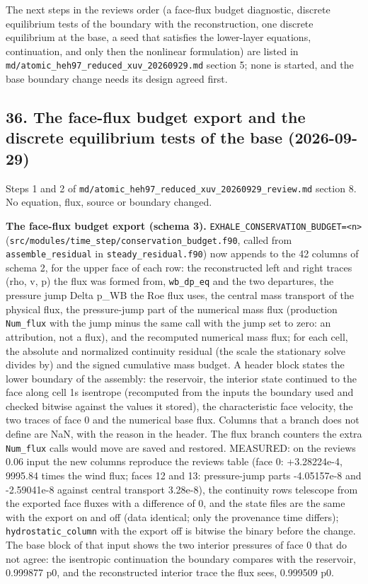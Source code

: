 \documentclass[english,a4paper]{my_memo}
\begin{document}
The next steps in the review\textquotesingle s order (a face-flux budget diagnostic,
discrete equilibrium tests of the boundary with the reconstruction, one
discrete equilibrium at the base, a seed that satisfies the lower-layer
equations, continuation, and only then the nonlinear formulation) are listed
in \texttt{md/atomic\_heh97\_reduced\_xuv\_20260929.md} section 5; none is started, and
the base boundary change needs its design agreed first.

\subsection{36. The face-flux budget export and the discrete equilibrium tests of the base (2026-09-29)}\label{36-the-face-flux-budget-export-and-the-discrete-equilibrium-tests-of-the-base-2026-09-29}

Steps 1 and 2 of \texttt{md/atomic\_heh97\_reduced\_xuv\_20260929\_review.md} section 8.
No equation, flux, source or boundary changed.

\textbf{The face-flux budget export (schema 3).} \texttt{EXHALE\_CONSERVATION\_BUDGET=\textless{}n\textgreater{}}
(\texttt{src/modules/time\_step/conservation\_budget.f90}, called from
\texttt{assemble\_residual} in \texttt{steady\_residual.f90}) now appends to the 42 columns
of schema 2, for the upper face of each row: the reconstructed left and right
traces (rho, v, p) the flux was formed from, \texttt{wb\_dp\_eq} and the two
departures, the pressure jump Delta p\_WB the Roe flux uses, the central mass
transport of the physical flux, the pressure-jump part of the numerical mass
flux (production \texttt{Num\_flux} with the jump minus the same call with the jump
set to zero: an attribution, not a flux), and the recomputed numerical mass
flux; for each cell, the absolute and normalized continuity residual (the
scale the stationary solve divides by) and the signed cumulative mass budget.
A header block states the lower boundary of the assembly: the reservoir, the
interior state continued to the face along cell 1\textquotesingle s isentrope (recomputed
from the inputs the boundary used and checked bitwise against the values it
stored), the characteristic face velocity, the two traces of face 0 and the
numerical base flux. Columns that a branch does not define are NaN, with the
reason in the header. The flux branch counters the extra \texttt{Num\_flux} calls
would move are saved and restored. MEASURED: on the review\textquotesingle s 0.06 input the
new columns reproduce the review\textquotesingle s table (face 0: +3.28224e-4, 9995.84 times
the wind flux; faces 12 and 13: pressure-jump parts -4.05157e-8 and
-2.59041e-8 against central transport 3.28e-8), the continuity rows
telescope from the exported face fluxes with a difference of 0, and the
state files are the same with the export on and off (data identical; only
the provenance time differs); \texttt{hydrostatic\_column} with the export off is
bitwise the binary before the change. The base block of that input shows the
two interior pressures of face 0 that do not agree: the isentropic
continuation the boundary compares with the reservoir, 0.999877 p0, and the
reconstructed interior trace the flux sees, 0.999509 p0.
\end{document}

